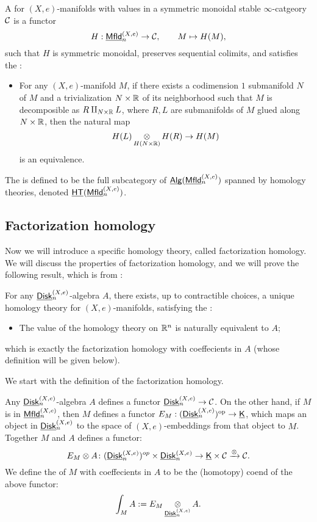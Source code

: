 \documentclass[twoside]{article}
\begin{document}
\begin{definition}
    A  for $(X,e)$-manifolds with values in a symmetric
    monoidal stable $\infty$-catgeory $\cal C$ is a functor 
    $$H:\underline{\smash{\mathsf{Mfld}}}_n^{(X,e)}\to\mathcal C,\qquad M\mapsto H(M),$$ 
    such that $H$ is symmetric monoidal, preserves sequential colimits,
    and satisfies the :
    \begin{itemize}
        \item For any $(X,e)$-manifold $M$, if there exists a codimension $1$
        submanifold $N$ of $M$ and a trivialization $N\times\mathbb{R}$ of its neighborhood
        such that $M$ is decomposible as $R\amalg_{N\times\mathbb{R}}L$, where $R, L$ are
        submanifolds of $M$ glued along $N\times\mathbb{R}$, then the natural map 
        $$H(L)\mathop{\operatorname{\otimes}}\limits_{H(N\times\mathbb{R})}H(R)\to H(M)$$
        is an equivalence.
    \end{itemize}
    The  is defined to be the
    full subcategory of $\underline{\smash{\mathsf{Alg}}}(\underline{\smash{\mathsf{Mfld}}}_n^{(X,e)})$ spanned by homology theories,
    denoted $\underline{\smash{\mathsf{HT}}}(\underline{\smash{\mathsf{Mfld}}}_n^{(X,e)})$.
\end{definition}

\subsection{Factorization homology}

Now we will introduce a specific homology theory, called factorization
homology. We will discuss the properties of factorization homology,
and we will prove the following result, which is from \cite{AF12}:

\begin{theorem}\label{e}
    For any $\underline{\smash{\mathsf{Disk}}}_n^{(X,e)}$-algebra $A$, there exists, up to contractible choices,
    a \textnormal{unique} homology theory for $(X,e)$-manifolds, satisfying the
    :
    \begin{itemize}
        \item The value of the homology theory on $\mathbb{R}^n$ is naturally equivalent to $A$;
    \end{itemize} 
    which is exactly the factorization homology with coeffecients in $A$
    (whose definition will be given below).
\end{theorem}

We start with the definition of the factorization homology.

\begin{definition}
    Any $\underline{\smash{\mathsf{Disk}}}_n^{(X,e)}$-algebra $A$ defines a functor 
    $\underline{\smash{\mathsf{Disk}}}_n^{(X,e)}\to\cal C$. On the other hand, if $M$ is in $\underline{\smash{\mathsf{Mfld}}}_n^{(X,e)}$,
    then $M$ defines a functor $E_M:(\underline{\smash{\mathsf{Disk}}}_n^{(X,e)})^{\mathrm{op}}\to\underline{\smash{\mathsf{K}}}$, which maps
    an object in $\underline{\smash{\mathsf{Disk}}}_n^{(X,e)}$ to the space of $(X,e)$-embeddings from that
    object to $M$. Together $M$ and $A$ defines a functor:
    $$E_M\otimes A\colon(\underline{\smash{\mathsf{Disk}}}_n^{(X,e)})^{op}\times\underline{\smash{\mathsf{Disk}}}_n^{(X,e)}\to\underline{\smash{\mathsf{K}}}\times\cal C
    \xrightarrow{\otimes}\cal C.$$ We define the
     of $M$ with coeffecients in $A$ to be the
    (homotopy) coend of the above functor: $$\int_MA:=E_M\mathop{\operatorname{\otimes}}\limits_{\underline{\smash{\mathsf{Disk}}}_n^{(X,e)}}A.$$
\end{definition} 
\end{document}
